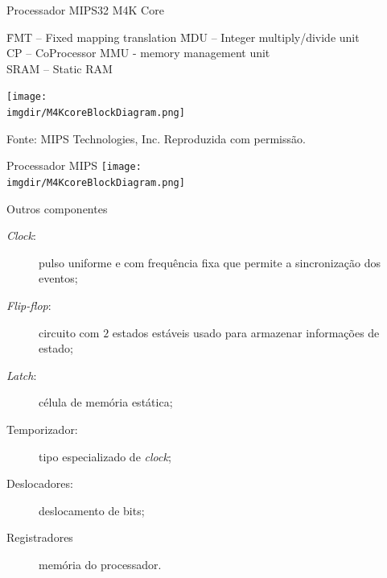 

\begin{frame}{Processador MIPS32 M4K Core}
{\tiny
  \begin{tabbing}
    \noindent \hspace{1cm}\=FMT -- Fixed mapping translation \hspace{.75cm}\=  MDU -- Integer multiply/divide unit\\
    \noindent \>CP -- CoProcessor \>  \noindent MMU - memory management unit\\
    \noindent \>SRAM -- Static RAM\\
\end{tabbing}
}
\vspace{-1cm}
  \texttt{[image: \\imgdir/M4KcoreBlockDiagram.png]}

  \vfill
  {\tiny\rm Fonte: MIPS Technologies, Inc. Reproduzida com permissão.}

  \end{frame}


\begin{frame}{Processador MIPS}
  \texttt{[image: \\imgdir/M4KcoreBlockDiagram.png]}
\end{frame}



\begin{frame}{Outros componentes}

  \begin{description}

  \item[{\em Clock}:] pulso uniforme e com frequência fixa que permite a
    sincronização dos eventos;
  \item[{\em Flip-flop}:] circuito com $2$ estados estáveis usado para
    armazenar informações de estado;
  \item[{\em Latch}:] célula de memória estática;
  \item[Temporizador:] tipo especializado de {\em clock};
  \item[Deslocadores:] deslocamento de bits;
  \item[Registradores] memória do processador.
  \end{description}
  
\end{frame}


